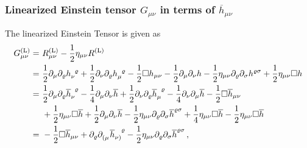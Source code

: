 \subsubsection{Linearized Einstein tensor \texorpdfstring{$G_{\mu\nu}$}{Gmunu} in terms of \texorpdfstring{$\overline{h}_{\mu\nu}$}{hbarmunu}}
The linearized Einstein Tensor is given as
\begin{equation}
    \begin{split}
        G_{\mu\nu}^{\text{(L)}} =\ & R_{\mu\nu}^{\text{(L)}} - \frac{1}{2} \eta_{\mu\nu} R^{\text{(L)}} \\
        =\ & \frac{1}{2} \partial_\mu \partial_\varrho \tensor{h}{_\nu^\varrho} + \frac{1}{2} \partial_\nu \partial_\varrho \tensor{h}{_\mu^\varrho}
        - \frac{1}{2} \Box h_{\mu\nu} - \frac{1}{2}
        \partial_{\mu}\partial_\nu h-\frac{1}{2}
        \eta_{\mu\nu}\partial_\varrho\partial_\sigma h^{\varrho\sigma} + \frac{1}{2} \eta_{\mu\nu}\Box h \\
        =\ & \frac{1}{2} \partial_\mu\partial_\varrho \tensor{\overline{h}}{_\nu^\varrho}
        - {\frac{1}{4}\partial_\mu\partial_\nu\overline{h}}
        + \frac{1}{2} \partial_\nu\partial_\varrho\tensor{\overline{h}}{_\mu^\varrho}
        - {\frac{1}{4}\partial_\nu\partial_\mu\overline{h}} - \frac{1}{2}\Box\overline{h}_{\mu\nu} \\
        & + {\frac{1}{2}\eta_{\mu\nu}\Box\overline{h}} + {\frac{1}{2}\partial_\mu\partial_\nu\overline{h}}
        - \frac{1}{2}\eta_{\mu\nu}\partial_\varrho\partial_\sigma\overline{h}^{\varrho\sigma}
        + {\frac{1}{4}\eta_{\mu\nu}\Box\overline{h}} - {\frac{1}{2}\eta_{\mu\nu}\Box\overline{h}} \\
        =\ & -\frac{1}{2} \Box \overline{h}_{\mu\nu} + \partial_\varrho \tensor{\partial}{_(_\mu}\tensor{\overline{h}}{_\nu_)^\varrho}
        - \frac{1}{2} \eta_{\mu\nu}\partial_\varrho\partial_\sigma
        \overline{h}^{\varrho\sigma}\,,
    \end{split}
\end{equation} 
